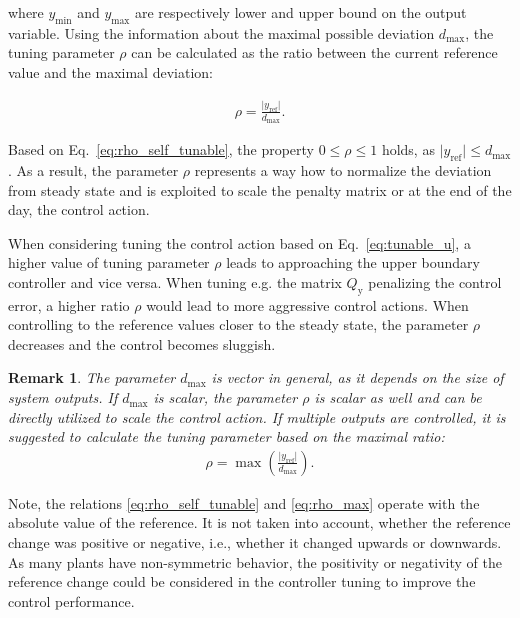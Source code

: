 \documentclass[preprint,12pt]{elsarticle}
\newtheorem{remark}[theorem]{Remark}
\begin{document}
where $y_{\min}$ and $y_{\max}$ are respectively lower and upper bound on the output variable. Using the information about the maximal possible deviation $d_{\max}$, the tuning parameter $\rho$ can be calculated as the ratio between the current reference value and the maximal deviation:  

\begin{eqnarray}
	\label{eq:rho_self_tunable}
	\rho = \frac{\vert y_{\mathrm{ref}} \vert}{d_{\max}}.
\end{eqnarray}

Based on Eq.~\eqref{eq:rho_self_tunable}, the property $0 \le \rho \le 1$ holds, as $\vert y_{\mathrm{ref}} \vert \le d_{\max}$. As a result, the parameter $\rho$ represents a way how to normalize the deviation from steady state and is exploited to scale the penalty matrix or at the end of the day, the control action. 

When considering tuning the control action based on Eq.~\eqref{eq:tunable_u}, a higher value of tuning parameter $\rho$ leads to approaching the upper boundary controller and vice versa. When tuning e.g. the matrix $Q_\mathrm{y}$ penalizing the control error, a higher ratio $\rho$ would lead to more aggressive control actions. When controlling to the reference values closer to the steady state, the parameter $\rho$ decreases and the control becomes sluggish.

\begin{remark}
	The parameter $d_{\max}$ is vector in general, as it depends on the size of system outputs. If $d_{\max}$ is scalar, the parameter $\rho$ is scalar as well and can be directly utilized to scale the control action. If multiple outputs are controlled, it is suggested to calculate the tuning parameter based on the maximal ratio:
	\begin{eqnarray}
		\label{eq:rho_max}
		\rho = \max \left( \frac{\vert y_{\mathrm{ref}} \vert}{d_{\max}} \right).
	\end{eqnarray}	
\end{remark}

Note, the relations \eqref{eq:rho_self_tunable} and \eqref{eq:rho_max} operate with the absolute value of the reference. It is not taken into account, whether the reference change was positive or negative, i.e., whether it changed upwards or downwards. As many plants have non-symmetric behavior, the positivity or negativity of the reference change could be considered in the controller tuning to improve the control performance.
    
\end{document}
